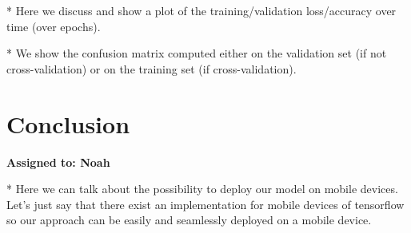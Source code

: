 \documentclass{article}
\begin{document}
* Here we discuss and show a plot of the training/validation loss/accuracy over time (over epochs).

* We show the confusion matrix computed either on the validation set (if not cross-validation) or
on the training set (if cross-validation).


\section{Conclusion}
\vspace{-.3cm}
\textbf{Assigned to: Noah}

* Here we can talk about the possibility to deploy our model on mobile devices. Let's just say that 
there exist an implementation for mobile devices of tensorflow so our approach can be easily and 
seamlessly deployed on a mobile device.
\end{document}
